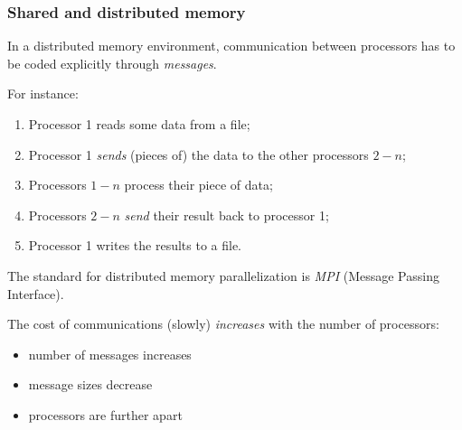 \documentclass[aspectratio=43,9pt]{beamer}
\begin{document}
\begin{frame}
	\frametitle{Shared and distributed memory}
	\begin{myitemize}{2ex}
		\item In a distributed memory environment, communication between processors has to be coded explicitly through \emph{messages}.
		\item For instance:
			\begin{enumerate}\vspace*{1ex}\setlength\itemsep{1ex}
				\item Processor 1 reads some data from a file;
				\item Processor 1 \emph{sends} (pieces of) the data to the other processors $2-n$;
				\item Processors $1-n$ process their piece of data;
				\item Processors $2-n$ \emph{send} their result back to processor 1;
				\item Processor 1 writes the results to a file.
			\end{enumerate}
		\item The standard for distributed memory parallelization is \emph{MPI} (Message Passing Interface).
		\item The cost of communications (slowly) \emph{increases} with the number of processors:
			\begin{itemize}
				\item number of messages increases
				\item message sizes decrease
				\item processors are further apart
			\end{itemize}
	\end{myitemize}
\end{frame}
%
%
\end{document}
